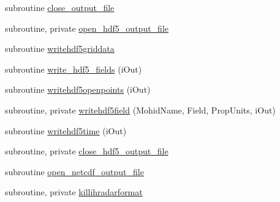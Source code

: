\begin{DoxyCompactItemize}
\item 
subroutine \mbox{\hyperlink{namespacemoduleihradarformat_a1107822e669c716ce7cbc68b6331ce30}{close\+\_\+output\+\_\+file}}
\item 
subroutine, private \mbox{\hyperlink{namespacemoduleihradarformat_a923e50f44a04ab5c716a0a2526b165e1}{open\+\_\+hdf5\+\_\+output\+\_\+file}}
\item 
subroutine \mbox{\hyperlink{namespacemoduleihradarformat_aded21feba733b9d42beced7d5846c854}{writehdf5griddata}}
\item 
subroutine \mbox{\hyperlink{namespacemoduleihradarformat_ad98c4a786bbe9735cd7eb3b391ad9adb}{write\+\_\+hdf5\+\_\+fields}} (i\+Out)
\item 
subroutine \mbox{\hyperlink{namespacemoduleihradarformat_a2599e1f0971dcb3531d9ee88d55830d8}{writehdf5openpoints}} (i\+Out)
\item 
subroutine, private \mbox{\hyperlink{namespacemoduleihradarformat_a77312b34323d0e8aa7466fdfc0f8a35e}{writehdf5field}} (Mohid\+Name, Field, Prop\+Units, i\+Out)
\item 
subroutine \mbox{\hyperlink{namespacemoduleihradarformat_abdd46dbddc8ccd64e7600d2abba43395}{writehdf5time}} (i\+Out)
\item 
subroutine, private \mbox{\hyperlink{namespacemoduleihradarformat_ab845f946974ab4a693701022e7e4230e}{close\+\_\+hdf5\+\_\+output\+\_\+file}}
\item 
subroutine \mbox{\hyperlink{namespacemoduleihradarformat_a26abbb9b22d84c708e9f26ef8003eff4}{open\+\_\+netcdf\+\_\+output\+\_\+file}}
\item 
subroutine, private \mbox{\hyperlink{namespacemoduleihradarformat_af1f8f7e2cf6ebd67fd284bbb39a55018}{killihradarformat}}
\end{DoxyCompactItemize}
